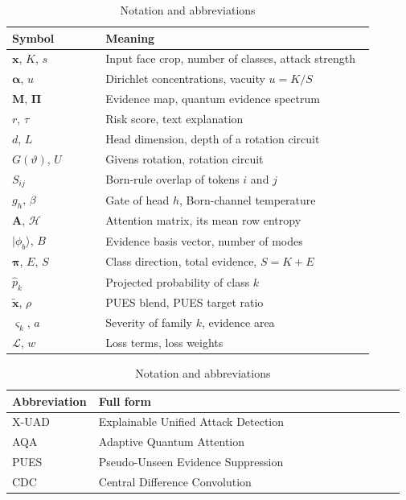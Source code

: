 \documentclass[conference]{IEEEtran}
\newcommand{\bs}[1]{\boldsymbol{#1}}
\newcommand{\ket}[1]{\lvert #1 \rangle}
\begin{document}
\begin{table}
\centering
\caption{Notation and abbreviations}
\label{tab:notation}
\scriptsize
\setlength{\tabcolsep}{3pt}
\begin{minipage}[t]{0.49\textwidth}
\centering
\begin{tabular}[t]{@{}p{0.25\linewidth}p{0.72\linewidth}@{}}
\toprule
Symbol & Meaning \\
\midrule
$\bs{x}$, $K$, $s$ & Input face crop, number of classes, attack strength \\
$\bs{\alpha}$, $u$ & Dirichlet concentrations, vacuity $u=K/S$ \\
$\bs{M}$, $\bs{\Pi}$ & Evidence map, quantum evidence spectrum \\
$r$, $\tau$ & Risk score, text explanation \\
$d$, $L$ & Head dimension, depth of a rotation circuit \\
$G(\vartheta)$, $U$ & Givens rotation, rotation circuit \\
$S_{ij}$ & Born-rule overlap of tokens $i$ and $j$ \\
$g_{h}$, $\beta$ & Gate of head $h$, Born-channel temperature \\
$\bs{A}$, $\mathcal{H}$ & Attention matrix, its mean row entropy \\
$\ket{\phi_{b}}$, $B$ & Evidence basis vector, number of modes \\
$\bs{\pi}$, $E$, $S$ & Class direction, total evidence, $S=K+E$ \\
$\hat{p}_{k}$ & Projected probability of class $k$ \\
$\tilde{\bs{x}}$, $\rho$ & PUES blend, PUES target ratio \\
$\varsigma_{k}$, $a$ & Severity of family $k$, evidence area \\
$\mathcal{L}$, $w$ & Loss terms, loss weights \\
\bottomrule
\end{tabular}
\end{minipage}\hfill
\begin{minipage}[t]{0.49\textwidth}
\centering
\begin{tabular}[t]{@{}p{0.20\linewidth}p{0.77\linewidth}@{}}
\toprule
Abbreviation & Full form \\
\midrule
X-UAD & Explainable Unified Attack Detection \\
AQA & Adaptive Quantum Attention \\
PUES & Pseudo-Unseen Evidence Suppression \\
CDC & Central Difference Convolution \\

\end{tabular}
\end{minipage}
\end{table}
\end{document}
